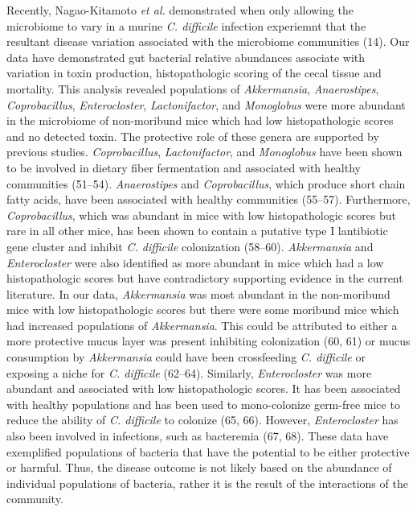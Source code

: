 \documentclass[
  12pt,
]{article}
\begin{document}
Recently, Nagao-Kitamoto \emph{et al.} demonstrated when only allowing
the microbiome to vary in a murine \emph{C. difficile} infection
experiemnt that the resultant disease variation associated with the
microbiome communities (14). Our data have demonstrated gut bacterial
relative abundances associate with variation in toxin production,
histopathologic scoring of the cecal tissue and mortality. This analysis
revealed populations of \emph{Akkermansia}, \emph{Anaerostipes},
\emph{Coprobacillus}, \emph{Enterocloster}, \emph{Lactonifactor}, and
\emph{Monoglobus} were more abundant in the microbiome of non-moribund
mice which had low histopathologic scores and no detected toxin. The
protective role of these genera are supported by previous studies.
\emph{Coprobacillus}, \emph{Lactonifactor}, and \emph{Monoglobus} have
been shown to be involved in dietary fiber fermentation and associated
with healthy communities (51--54). \emph{Anaerostipes} and
\emph{Coprobacillus}, which produce short chain fatty acids, have been
associated with healthy communities (55--57). Furthermore,
\emph{Coprobacillus}, which was abundant in mice with low
histopathologic scores but rare in all other mice, has been shown to
contain a putative type I lantibiotic gene cluster and inhibit \emph{C.
difficile} colonization (58--60). \emph{Akkermansia} and
\emph{Enterocloster} were also identified as more abundant in mice which
had a low histopathologic scores but have contradictory supporting
evidence in the current literature. In our data, \emph{Akkermansia} was
most abundant in the non-moribund mice with low histopathologic scores
but there were some moribund mice which had increased populations of
\emph{Akkermansia}. This could be attributed to either a more protective
mucus layer was present inhibiting colonization (60, 61) or mucus
consumption by \emph{Akkermansia} could have been crossfeeding \emph{C.
difficile} or exposing a niche for \emph{C. difficile} (62--64).
Similarly, \emph{Enterocloster} was more abundant and associated with
low histopathologic scores. It has been associated with healthy
populations and has been used to mono-colonize germ-free mice to reduce
the ability of \emph{C. difficile} to colonize (65, 66). However,
\emph{Enterocloster} has also been involved in infections, such as
bacteremia (67, 68). These data have exemplified populations of bacteria
that have the potential to be either protective or harmful. Thus, the
disease outcome is not likely based on the abundance of individual
populations of bacteria, rather it is the result of the interactions of
the community.
\end{document}
